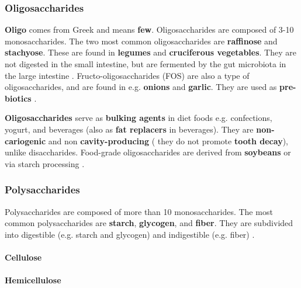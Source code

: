 \subsubsection*{Oligosaccharides}
\textbf{Oligo} comes from Greek and means \textbf{few}. Oligosaccharides are composed of 3-10 monosaccharides. The two most common oligosaccharides are \textbf{raffinose} and \textbf{stachyose}. These are found in \textbf{legumes} and \textbf{cruciferous vegetables}. They are not digested in the small intestine, but are fermented by the gut microbiota in the large intestine \cite*{BKR_02}. Fructo-oligosaccharides (FOS) are also a type of oligosaccharides, and are found in e.g. \textbf{onions} and \textbf{garlic}. They are used as \textbf{pre-biotics} \cite*{BKR_02}.


\textbf{Oligosaccharides} serve as \textbf{bulking agents} in diet foods e.g. confections, yogurt, and beverages (also as \textbf{fat replacers} in beverages). They are \textbf{non-cariogenic} and non \textbf{cavity-producing} ( they do not promote \textbf{tooth decay}), unlike disaccharides. Food-grade oligosaccharides are derived from \textbf{soybeans} or via starch processing \cite*{BKR_02}.

\subsubsection*{Polysaccharides}
Polysaccharides are composed of more than 10 monosaccharides. The most common polysaccharides are \textbf{starch}, \textbf{glycogen}, and \textbf{fiber}. They are subdivided into digestible (e.g. starch and glycogen) and indigestible (e.g. fiber) \cite*{BKR_02}.







\paragraph*{Cellulose}
\paragraph*{Hemicellulose}
